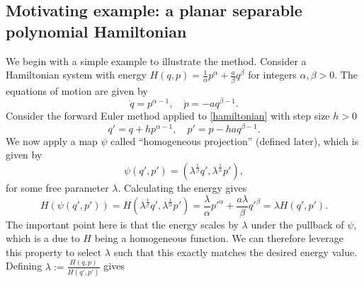 \documentclass[final,3p,times]{elsarticle}
\begin{document}
\subsection{Motivating example: a planar separable polynomial Hamiltonian}
We begin with a simple example to illustrate the method. Consider a Hamiltonian system with energy $H(q,p) = \frac{1}{\alpha}p^\alpha + \frac{a}{\beta}q^\beta$ for integers $\alpha, \beta > 0$. The equations of motion are given by
\begin{equation}\label{hamiltonian}
    \dot{q} = p^{\alpha-1}, \quad \dot{p} = -aq^{\beta-1}.
\end{equation}
Consider the forward Euler method applied to \eqref{hamiltonian} with step size $h>0$
\begin{equation}
    q' = q + h p^{\alpha-1}, \quad p' = p - h a q^{\beta - 1}.
\end{equation}
We now apply a map $\psi$ called ``homogeneous projection'' (defined later), which is given by
\begin{equation}\label{proj fe}
        \psi(q',p')=(\lambda^{\frac{1}{\beta}}q',\lambda^{\frac{1}{\alpha}}p'),
\end{equation}
for some free parameter $\lambda$. Calculating the energy gives
\begin{equation}
    H(\psi(q',p')) = H(\lambda^{\frac{1}{\beta}} q',\lambda^{\frac{1}{\alpha}}p') = \frac{\lambda}{\alpha} p'^\alpha + \frac{a\lambda}{\beta} q'^\beta = \lambda H(q',p').
\end{equation} 
The important point here is that the energy scales by $\lambda$ under the pullback of $\psi$, which is a due to $H$ being a homogeneous function. We can therefore leverage this property to select $\lambda$ such that this exactly matches the desired energy value. Defining $\lambda := \frac{H(q,p)}{H(q',p')}$ gives 
\end{document}

